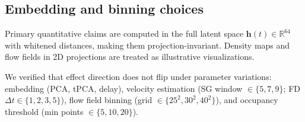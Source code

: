 \documentclass[5p,twocolumn,authoryear]{elsarticle}
\begin{document}

\subsection{Embedding and binning choices}
\label{app:stress_test}

Primary quantitative claims are computed in the full latent space $\mathbf{h}(t) \in \mathbb{R}^{64}$ with whitened distances, making them projection-invariant. Density maps and flow fields in 2D projections are treated as illustrative visualizations.

We verified that effect direction does not flip under parameter variations: embedding (PCA, tPCA, delay), velocity estimation (SG window $\in \{5, 7, 9\}$; FD $\Delta t \in \{1, 2, 3, 5\}$), flow field binning (grid $\in \{25^2, 30^2, 40^2\}$), and occupancy threshold (min points $\in \{5, 10, 20\}$).

\end{document}
